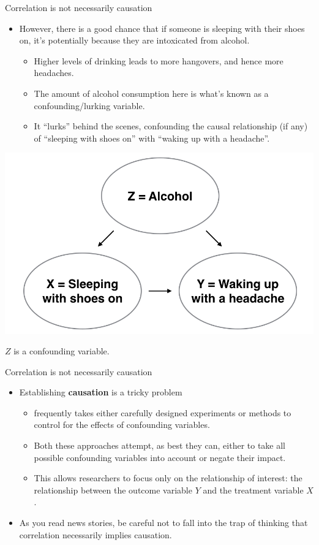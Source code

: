 \documentclass[
  ignorenonframetext,
]{beamer}
\providecommand{\tightlist}{%
  \setlength{\itemsep}{0pt}\setlength{\parskip}{0pt}}
\begin{document}
\begin{frame}{Correlation is not necessarily causation}
\protect\hypertarget{correlation-is-not-necessarily-causation-2}{}
\begin{itemize}
\item
  However, there is a good chance that if someone is sleeping with their
  shoes on, it's potentially because they are intoxicated from alcohol.

  \begin{itemize}
  \tightlist
  \item
    Higher levels of drinking leads to more hangovers, and hence more
    headaches.
  \item
    The amount of alcohol consumption here is what's known as a
    confounding/lurking variable.
  \item
    It ``lurks'' behind the scenes, confounding the causal relationship
    (if any) of ``sleeping with shoes on'' with ``waking up with a
    headache''.
  \end{itemize}
\end{itemize}

\begin{center}\includegraphics[width=0.6\linewidth,height=0.3\textheight]{week4_8} \end{center}

\(Z\) is a confounding variable.
\end{frame}

\begin{frame}{Correlation is not necessarily causation}
\protect\hypertarget{correlation-is-not-necessarily-causation-3}{}
\begin{itemize}
\item
  Establishing \textbf{causation} is a tricky problem

  \begin{itemize}
  \tightlist
  \item
    frequently takes either carefully designed experiments or methods to
    control for the effects of confounding variables.
  \item
    Both these approaches attempt, as best they can, either to take all
    possible confounding variables into account or negate their impact.
  \item
    This allows researchers to focus only on the relationship of
    interest: the relationship between the outcome variable \(Y\) and
    the treatment variable \(X\).
  \end{itemize}
\item
  As you read news stories, be careful not to fall into the trap of
  thinking that correlation necessarily implies causation.
\end{itemize}
\end{frame}
\end{document}
